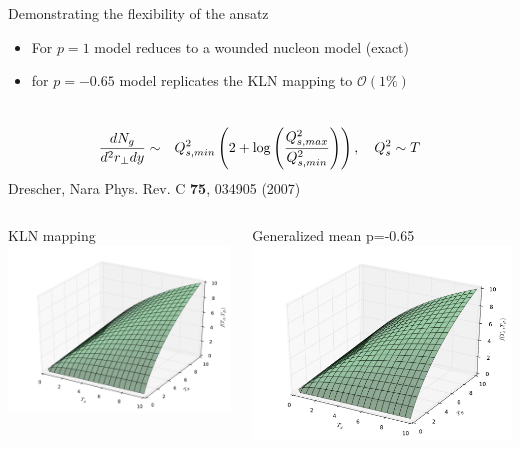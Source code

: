 \documentclass[svgnames]{beamer}
\begin{document}
\begin{frame}{Demonstrating the flexibility of the ansatz}
 \begin{itemize}
  \item For $p=1$ model reduces to a wounded nucleon model (exact)
  \item for $p=-0.65$ model replicates the KLN mapping to $\mathcal{O}(1\%)$
 \end{itemize}
 \vspace{-0.2 in}
 \begin{eqnarray*}
  \cr \frac{dN_g}{d^2 r_\perp dy} &\sim& Q^2_{s,min} \left(2 + \log \left(\frac{Q^2_{s,max}}{Q^2_{s,min}} \right) \right), \quad Q_s^2 \sim T
 \end{eqnarray*}
 \vspace{-0.1 in} \centering \footnotesize Drescher, Nara Phys. Rev. C {\bf 75}, 034905 (2007)
 \vspace{0.3 in}
 \begin{columns}
  \begin{column}{0.4\textwidth}
    \centering \footnotesize KLN mapping \\
    \includegraphics[width=\linewidth]{KLN}
  \end{column}
  \begin{column}{0.4\textwidth}
   \centering \footnotesize Generalized mean p=-0.65
   \includegraphics[width=\linewidth]{KLN}

\end{column}
\end{columns}
\end{frame}
\end{document}
